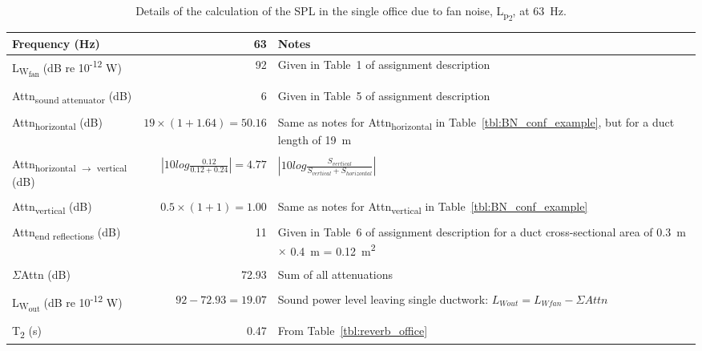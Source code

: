 \begin{sidewaystable}[htbp]
	\caption{Details of the calculation of the SPL in the single office due to fan noise, L\textsubscript{p\textsubscript{2}}, at 63~Hz.}
	\label{tbl:BN_office_example}
	\centering
	\begin{tabular}{@{}m{5cm}rm{12cm}@{}}
		\toprule
		Frequency (Hz) & 63 & Notes \\ \midrule
		L\textsubscript{W\textsubscript{fan}} (dB re 10\textsuperscript{-12} W) & 92 & Given in Table~1 of assignment description \\
		& \multicolumn{1}{l}{} &  \\
		Attn\textsubscript{sound attenuator} (dB) & 6 & Given in Table~5 of assignment description \\
		& \multicolumn{1}{l}{} &  \\
		Attn\textsubscript{horizontal} (dB) & $19 \times (1 + 1.64) = 50.16$ & Same as notes for Attn\textsubscript{horizontal} in Table~\ref{tbl:BN_conf_example}, but for a duct length of 19~m \\
		& \multicolumn{1}{l}{} &  \\
		Attn\textsubscript{horizontal $\rightarrow$ vertical} (dB) & $\left|10 log \frac{0.12}{0.12 + 0.24}\right| = 4.77$ & $\left|10 log \frac{S_{vertical}}{S_{vertical} + S_{horizontal}}\right|$ \\
		& \multicolumn{1}{l}{} &  \\
		Attn\textsubscript{vertical} (dB) & $0.5 \times (1 + 1) = 1.00$ & Same as notes for Attn\textsubscript{vertical} in Table~\ref{tbl:BN_conf_example} \\
		& \multicolumn{1}{l}{} &  \\
		Attn\textsubscript{end reflections} (dB) & 11 & Given in Table~6 of assignment description for a duct cross-sectional area of 0.3~m $\times$ 0.4~m = 0.12~m\textsuperscript{2} \\
		& \multicolumn{1}{l}{} &  \\
		$\Sigma$Attn (dB) & 72.93 & Sum of all attenuations \\
		& \multicolumn{1}{l}{} &  \\
		L\textsubscript{W\textsubscript{out}} (dB re 10\textsuperscript{-12} W) & $92 - 72.93 = 19.07$ & Sound power level leaving single ductwork: $L_{W out} = L_{W fan} - \Sigma Attn$ \\
		& \multicolumn{1}{l}{} &  \\
		T\textsubscript{2} (s) & 0.47 & From Table~\ref{tbl:reverb_office} \\

\end{tabular}
\end{sidewaystable}
